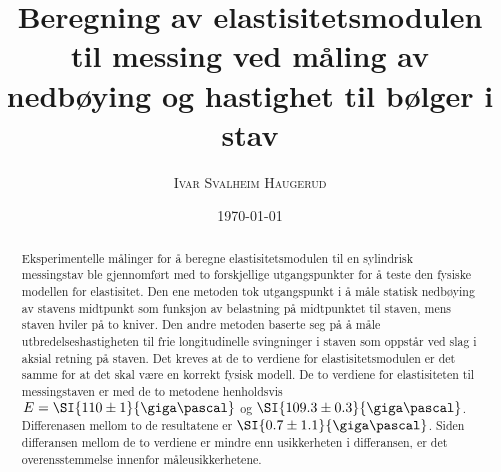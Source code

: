 \documentclass[%
 reprint,
nofootinbib,
aps,
]{revtex4-1}
\begin{document}
\title{Beregning av elastisitetsmodulen til messing ved måling av nedbøying og hastighet til bølger i stav}
\author{\textsc{Ivar Svalheim Haugerud}}
\date{\today}

\begin{abstract}
  Eksperimentelle målinger for å beregne elastisitetsmodulen til en sylindrisk messingstav ble gjennomført med to forskjellige utgangspunkter for å teste den fysiske modellen for elastisitet. Den ene metoden tok utgangspunkt i å måle statisk nedbøying av stavens midtpunkt som funksjon av belastning på midtpunktet til staven, mens staven hviler på to kniver. Den andre metoden baserte seg på å måle utbredelseshastigheten til frie longitudinelle svingninger i staven som oppstår ved slag i aksial retning på staven. Det kreves at de to verdiene for elastisitetsmodulen er det samme for at det skal være en korrekt fysisk modell. De to verdiene for elastisiteten til messingstaven er med de to metodene henholdsvis
  $E=\SI{110\pm1}{\giga\pascal}$ og $\SI{109.3\pm0.3}{\giga\pascal}$. Differenasen mellom to de resultatene er $\SI{0.7\pm1.1}{\giga\pascal}$. Siden differansen mellom de to verdiene er mindre enn usikkerheten i differansen, er det overensstemmelse innenfor måleusikkerhetene.
\end{abstract}

\maketitle

\end{document}
